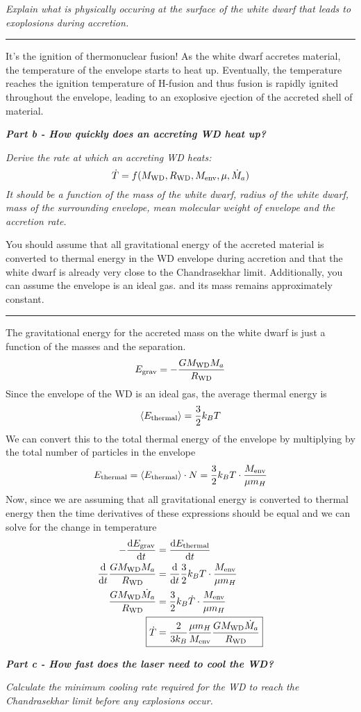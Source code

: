\documentclass[12pt, letterpaper, twoside]{article}
\newcommand{\question}[1]{{\noindent \it #1}}
\newcommand{\answer}[1]{
    \par\noindent\rule{\textwidth}{0.4pt}#1\vspace{0.5cm}
}
\newcommand{\avg}[1]{\left\langle #1 \right\rangle}
\begin{document}
\question{Explain what is physically occuring at the surface of the white dwarf that leads to exoplosions during accretion.}

\answer{
    It's the ignition of thermonuclear fusion! As the white dwarf accretes material, the temperature of the envelope starts to heat up. Eventually, the temperature reaches the ignition temperature of H-fusion and thus fusion is rapidly ignited throughout the envelope, leading to an exoplosive ejection of the accreted shell of material.
}

\clearpage

\question{\textbf{Part b - How quickly does an accreting WD heat up?}}

\question{Derive the rate at which an accreting WD heats:
\begin{equation}
    \dot{T} = f(M_{\rm WD}, R_{\rm WD}, M_{\rm env}, \mu, \dot{M}_a)
\end{equation}
It should be a function of the mass of the white dwarf, radius of the white dwarf, mass of the surrounding envelope, mean molecular weight of envelope and the accretion rate.

You should assume that all gravitational energy of the accreted material is converted to thermal energy in the WD envelope during accretion and that the white dwarf is already very close to the Chandrasekhar limit. Additionally, you can assume the envelope is an ideal gas. and its mass remains approximately constant.}

\answer{
    The gravitational energy for the accreted mass on the white dwarf is just a function of the masses and the separation.
    \begin{equation}
        E_{\rm grav} = - \frac{G M_{\rm WD} M_a}{R_{\rm WD}}
    \end{equation}
    Since the envelope of the WD is an ideal gas, the average thermal energy is
    \begin{equation}
        \avg{E_{\rm thermal}} = \frac{3}{2} k_B T
    \end{equation}
    We can convert this to the total thermal energy of the envelope by multiplying by the total number of particles in the envelope
    \begin{equation}
        E_{\rm thermal} = \avg{E_{\rm thermal}} \cdot N = \frac{3}{2} k_B T \cdot \frac{M_{\rm env}}{\mu m_H}
    \end{equation}
    Now, since we are assuming that all gravitational energy is converted to thermal energy then the time derivatives of these expressions should be equal and we can solve for the change in temperature
    \begin{align}
        - \dv{E_{\rm grav}}{t} &= \dv{E_{\rm thermal}}{t} \\
        \dv{t} \frac{G M_{\rm WD} M_a}{R_{\rm WD}} &= \dv{t} \frac{3}{2} k_B T \cdot \frac{M_{\rm env}}{\mu m_H} \\
        \frac{G M_{\rm WD} \dot{M}_a}{R_{\rm WD}} &= \frac{3}{2} k_B \dot{T} \cdot \frac{M_{\rm env}}{\mu m_H} \\
        \Aboxed{ \dot{T} &= \frac{2}{3 k_B} \frac{\mu m_H}{M_{\rm env}} \frac{G M_{\rm WD} \dot{M}_a}{R_{\rm WD}} }
    \end{align}
}

\question{\textbf{Part c - How fast does the laser need to cool the WD?}}

\question{Calculate the minimum cooling rate required for the WD to reach the Chandrasekhar limit before any explosions occur.}
\end{document}

